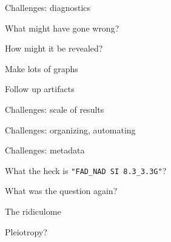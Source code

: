 \documentclass[12pt,t]{beamer}
\begin{document}
\begin{frame}[c]{Challenges: {\color{foreground} diagnostics}}

\vspace{-20mm}

  \bbi
\item What might have gone wrong?
\item How might it be revealed?
\item Make lots of graphs
\item Follow up artifacts
  \ei

\end{frame}




\begin{frame}[c]{Challenges: {\color{foreground} scale of results}}


\end{frame}




\begin{frame}[c]{Challenges: {\color{foreground} organizing, automating}}


\end{frame}


\begin{frame}[c]{Challenges: {\color{foreground} metadata}}


  \centerline{What the heck is {\hilit \tt "FAD\_NAD SI 8.3\_3.3G"}?}

\end{frame}



\begin{frame}[c]{}
\centerline{\Large What was the question again?}
\end{frame}



\begin{frame}[c]{The ridiculome}
\end{frame}


\begin{frame}[c]{Pleiotropy?}
\end{frame}
\end{document}

